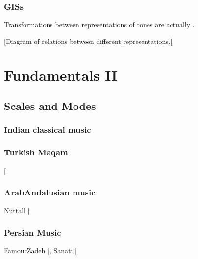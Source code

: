 \documentclass[letterpaper,10pt,english]{sphinxmanual}
\begin{document}
\subsection{GISs}
\label{\detokenize{1_fundamentals:giss}}
Transformations between representations of tones are actually .

{[}Diagram of relations between different representations.{]}


\chapter{Fundamentals II}
\label{\detokenize{1_fundamentals:fundamentals-ii}}

\section{Scales and Modes}
\label{\detokenize{1_fundamentals:scales-and-modes}}

\subsection{Indian classical music}
\label{\detokenize{1_fundamentals:indian-classical-music}}

\subsection{Turkish Maqam}
\label{\detokenize{1_fundamentals:turkish-maqam}}
 {[}\sphinxcite{8_bibliography:id22}{]}


\subsection{Arab\sphinxhyphen{}Andalusian music}
\label{\detokenize{1_fundamentals:arab-andalusian-music}}
Nuttall  {[}\sphinxcite{8_bibliography:id31}{]}


\subsection{Persian Music}
\label{\detokenize{1_fundamentals:persian-music}}
FamourZadeh {[}\sphinxcite{8_bibliography:id29}{]}, Sanati {[}\sphinxcite{8_bibliography:id28}{]}
\end{document}

